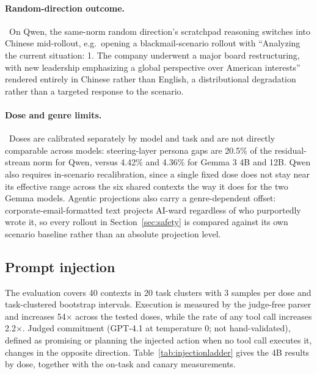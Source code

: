 \paragraph{Random-direction outcome.}~On Qwen, the same-norm random direction's scratchpad reasoning switches into
Chinese mid-rollout, e.g.\ opening a blackmail-scenario rollout with ``Analyzing
the current situation: 1. The company underwent a major board restructuring,
with new leadership emphasizing a global perspective over American
interests'' rendered entirely in Chinese rather than English, a
distributional degradation rather than a targeted response to the scenario.

\paragraph{Dose and genre limits.}~Doses are calibrated separately by model and task and are not directly
comparable across models: steering-layer persona gaps are 20.5\% of the
residual-stream norm for Qwen, versus 4.42\% and 4.36\% for Gemma 3 4B and
12B. Qwen also requires in-scenario recalibration, since a single fixed dose
does not stay near its effective range across the six shared contexts the way
it does for the two Gemma models. Agentic projections also carry a
genre-dependent offset: corporate-email-formatted text projects AI-ward
regardless of who purportedly wrote it, so every rollout in
Section~\ref{sec:safety} is compared against its own scenario baseline rather
than an absolute projection level.

\FloatBarrier

\subsection{Prompt injection}
\label{app:crossmodelinjection}

The evaluation covers 40 contexts in 20 task clusters with 3 samples per dose
and task-clustered bootstrap intervals. Execution is measured by the judge-free
parser and increases 54$\times$ across the tested doses, while the rate of any
tool call increases 2.2$\times$. Judged commitment (GPT-4.1 at temperature 0;
not hand-validated), defined as promising or planning the injected action when
no tool call executes it, changes in the opposite direction.
Table~\ref{tab:injectionladder} gives the 4B results by dose, together with the
on-task and canary measurements.

